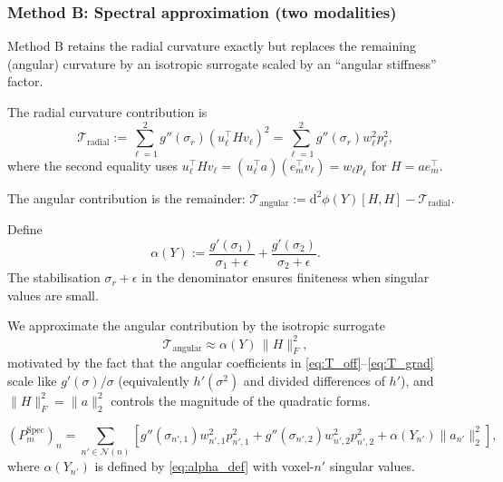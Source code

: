 \subsubsection{Method B: Spectral approximation (two modalities)}
\label{subsubsec:method_B}

Method B retains the radial curvature exactly but replaces the remaining (angular) curvature by an isotropic surrogate scaled by an ``angular stiffness'' factor.

\begin{definition}
The radial curvature contribution is
\begin{equation}
\mathcal{T}_{\mathrm{radial}} := \sum_{\ell=1}^{2} g''(\sigma_r) (u_\ell^\top H v_\ell)^2 = \sum_{\ell=1}^{2} g''(\sigma_r) w_\ell^2 p_\ell^2,
\end{equation}
where the second equality uses $u_\ell^\top H v_\ell = (u_\ell^\top a)(e_m^\top v_\ell) = w_\ell p_\ell$ for $H = a e_m^\top$.

The angular contribution is the remainder: $\mathcal{T}_{\mathrm{angular}} := \mathrm{d}^2 \phi(Y)[H, H] - \mathcal{T}_{\mathrm{radial}}$.
\end{definition}

\begin{definition}
Define
\begin{equation}
\alpha(Y) := \frac{g'(\sigma_1)}{\sigma_1 + \epsilon} + \frac{g'(\sigma_2)}{\sigma_2 + \epsilon}.
\label{eq:alpha_def}
\end{equation}
The stabilisation $\sigma_r + \epsilon$ in the denominator ensures finiteness when singular values are small.
\end{definition}

\begin{proposition}
\label{prop:angular_bound}
We approximate the angular contribution by the isotropic surrogate
\begin{equation}
\mathcal{T}_{\mathrm{angular}} \approx \alpha(Y)\,\|H\|_F^2,
\end{equation}
motivated by the fact that the angular coefficients in \eqref{eq:T_off}--\eqref{eq:T_grad} scale like $g'(\sigma)/\sigma$ (equivalently $h'(\sigma^2)$ and divided differences of $h'$), and $\|H\|_F^2=\|a\|_2^2$ controls the magnitude of the quadratic forms.
\end{proposition}

\begin{theorem}
\label{thm:method_B}
\begin{equation}
(P_m^{\mathrm{Spec}})_n = \sum_{n' \in \mathcal{N}(n)} \left[ g''(\sigma_{n',1}) w_{n',1}^2 p_{n',1}^2 + g''(\sigma_{n',2}) w_{n',2}^2 p_{n',2}^2 + \alpha(Y_{n'}) \|a_{n'}\|_2^2 \right],
\end{equation}
where $\alpha(Y_{n'})$ is defined by \eqref{eq:alpha_def} with voxel-$n'$ singular values.
\end{theorem}


